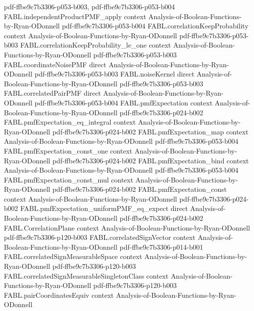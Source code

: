 \begin{theorem}
  {pdf-ffbe9c7b3306-p053-b003,
    pdf-ffbe9c7b3306-p053-b004}
\proofstep
  {FABL.independentProductPMF_apply}
  {context}
  {Analysis-of-Boolean-Functions-by-Ryan-ODonnell}
  {pdf-ffbe9c7b3306-p053-b004}
\proofstep
  {FABL.correlationKeepProbability}
  {context}
  {Analysis-of-Boolean-Functions-by-Ryan-ODonnell}
  {pdf-ffbe9c7b3306-p053-b003}
\proofstep
  {FABL.correlationKeepProbability_le_one}
  {context}
  {Analysis-of-Boolean-Functions-by-Ryan-ODonnell}
  {pdf-ffbe9c7b3306-p053-b003}
\proofstep
  {FABL.coordinateNoisePMF}
  {direct}
  {Analysis-of-Boolean-Functions-by-Ryan-ODonnell}
  {pdf-ffbe9c7b3306-p053-b003}
\proofstep
  {FABL.noiseKernel}
  {direct}
  {Analysis-of-Boolean-Functions-by-Ryan-ODonnell}
  {pdf-ffbe9c7b3306-p053-b003}
\proofstep
  {FABL.correlatedPairPMF}
  {direct}
  {Analysis-of-Boolean-Functions-by-Ryan-ODonnell}
  {pdf-ffbe9c7b3306-p053-b004}
\proofstep
  {FABL.pmfExpectation}
  {context}
  {Analysis-of-Boolean-Functions-by-Ryan-ODonnell}
  {pdf-ffbe9c7b3306-p024-b002}
\proofstep
  {FABL.pmfExpectation_eq_integral}
  {context}
  {Analysis-of-Boolean-Functions-by-Ryan-ODonnell}
  {pdf-ffbe9c7b3306-p024-b002}
\proofstep
  {FABL.pmfExpectation_map}
  {context}
  {Analysis-of-Boolean-Functions-by-Ryan-ODonnell}
  {pdf-ffbe9c7b3306-p053-b004}
\proofstep
  {FABL.pmfExpectation_const_one}
  {context}
  {Analysis-of-Boolean-Functions-by-Ryan-ODonnell}
  {pdf-ffbe9c7b3306-p024-b002}
\proofstep
  {FABL.pmfExpectation_bind}
  {context}
  {Analysis-of-Boolean-Functions-by-Ryan-ODonnell}
  {pdf-ffbe9c7b3306-p053-b004}
\proofstep
  {FABL.pmfExpectation_const_mul}
  {context}
  {Analysis-of-Boolean-Functions-by-Ryan-ODonnell}
  {pdf-ffbe9c7b3306-p024-b002}
\proofstep
  {FABL.pmfExpectation_const}
  {context}
  {Analysis-of-Boolean-Functions-by-Ryan-ODonnell}
  {pdf-ffbe9c7b3306-p024-b002}
\proofstep
  {FABL.pmfExpectation_uniformPMF_eq_expect}
  {direct}
  {Analysis-of-Boolean-Functions-by-Ryan-ODonnell}
  {pdf-ffbe9c7b3306-p024-b002}
\proofstep
  {FABL.CorrelationPlane}
  {context}
  {Analysis-of-Boolean-Functions-by-Ryan-ODonnell}
  {pdf-ffbe9c7b3306-p120-b003}
\proofstep
  {FABL.correlatedSignVector}
  {context}
  {Analysis-of-Boolean-Functions-by-Ryan-ODonnell}
  {pdf-ffbe9c7b3306-p014-b001}
\proofstep
  {FABL.correlatedSignMeasurableSpace}
  {context}
  {Analysis-of-Boolean-Functions-by-Ryan-ODonnell}
  {pdf-ffbe9c7b3306-p120-b003}
\proofstep
  {FABL.correlatedSignMeasurableSingletonClass}
  {context}
  {Analysis-of-Boolean-Functions-by-Ryan-ODonnell}
  {pdf-ffbe9c7b3306-p120-b003}
\proofstep
  {FABL.pairCoordinatesEquiv}
  {context}
  {Analysis-of-Boolean-Functions-by-Ryan-ODonnell}

\end{theorem}

